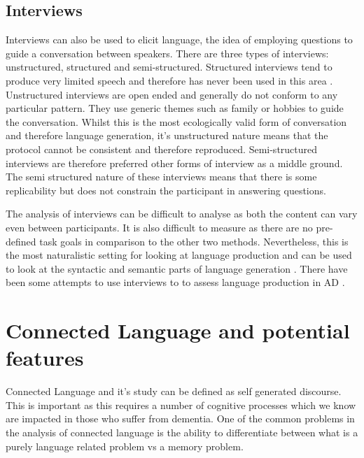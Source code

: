 \documentclass[a4paper]{article}
\begin{document}
\subsection{Interviews}
Interviews can also be used to elicit language, the idea of employing questions to guide a conversation between speakers. There are three types of interviews: unstructured, structured and semi-structured. Structured interviews tend to produce very limited speech and therefore has never been used in this area \cite{Boschi2017}. Unstructured interviews are open ended and generally do not conform to any particular pattern. They use generic themes such as family or hobbies to guide the conversation. Whilst this is the most ecologically valid form of conversation and therefore language generation, it's unstructured nature means that the protocol cannot be consistent and therefore reproduced. Semi-structured interviews are therefore preferred other forms of interview as a middle ground. The semi structured nature of these interviews means that there is some replicability but does not constrain the participant in answering questions. \newline
\par
The analysis of interviews can be difficult to analyse as both the content can vary even between participants. It is also difficult to measure as there are no pre-defined task goals in comparison to the other two methods. Nevertheless, this is the most naturalistic setting for looking at language production and can be used to look at the syntactic and semantic parts of language generation \cite{Sajjadi2012}. There have been some attempts to use interviews to to assess language production in AD \cite{}.\newline
\par
\section{Connected Language and potential features}
Connected Language and it's study can be defined as self generated discourse. This is important as this requires a number of cognitive processes which we know are impacted in those who suffer from dementia. One of the common problems in the analysis of connected language is the ability to differentiate between what is a purely language related problem vs a memory problem. \newline
\par
\end{document}
